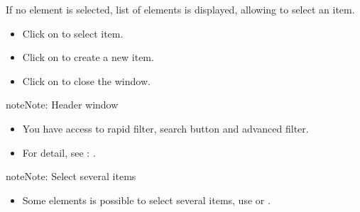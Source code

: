 \documentclass[letterpaper,10pt,english]{sphinxmanual}
\begin{document}
If no element is selected, list of elements is displayed, allowing to select an item.
\begin{figure}[htbp]
\centering

\end{figure}
\begin{itemize}
\item {} 
Click on  to select item.

\item {} 
Click on  to create a new item.

\item {} 
Click on  to close the window.

\end{itemize}

\begin{notice}{note}{Note:}
Header window
\begin{itemize}
\item {} 
You have access to rapid filter, search button and advanced filter.

\item {} 
For detail, see : {\hyperref[Gui:gui-list-window-label]{\emph{}}}.

\end{itemize}
\end{notice}

\begin{notice}{note}{Note:}
Select several items
\begin{itemize}
\item {} 
Some elements is possible to select several items, use  or .

\end{itemize}
\end{notice}
\end{document}

